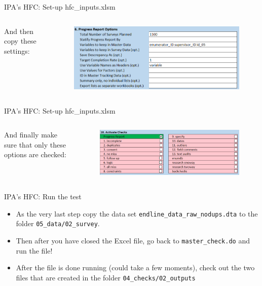 \documentclass[aspectratio=169]{beamer}
\begin{document}
\begin{frame}{IPA's HFC: Set-up hfc\_inputs.xlsm}
	\begin{columns}[c]
		
		\small And then copy these settings:
		
		\begin{figure}
			\centering
			\includegraphics[width=\linewidth]{img/ipacheck-setup-3.png}
		\end{figure}
	\end{columns}
\end{frame}

\begin{frame}{IPA's HFC: Set-up hfc\_inputs.xlsm}
	\begin{columns}[c]
		
		\column{.22\linewidth}
		\small And finally make sure that only these options are checked:
		
		\column{.78\linewidth}
		\begin{figure}
			\centering
			\includegraphics[width=\linewidth]{img/ipacheck-setup-4.png}
		\end{figure}
	\end{columns}
\end{frame}

\begin{frame}{IPA's HFC: Run the test}

	\begin{itemize}
		\item As the very last step copy the data set \texttt{endline\_data\_raw\_nodups.dta} to the folder \texttt{05\_data/02\_survey}. 
		\item Then after you have closed the Excel file, go back to \texttt{master\_check.do} and run the file!
		\item After the file is done running (could take a few moments), check out the two files that are created in the folder \texttt{04\_checks/02\_outputs}
	\end{itemize}
\end{frame}
\end{document}
